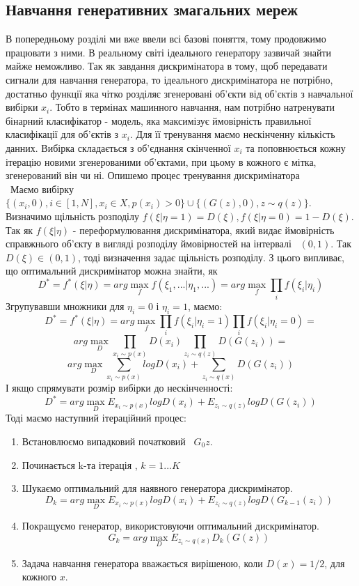 \documentclass{article}
\begin{document}
  \subsection{Навчання генеративних змагальних мереж}
  \null\quad В попередньому розділі ми вже ввели всі базові поняття, тому продовжимо працювати з ними. В реальному світі ідеального генератору зазвичай знайти майже неможливо. Так як завдання дискримінатора в тому, щоб передавати сигнали для навчання генератора, то ідеального дискримінатора не потрібно, достатньо функції яка чітко розділяє згенеровані об'єкти від об'єктів з навчальної вибірки ${x_i}$. Тобто в термінах машинного навчання, нам потрібно натренувати бінарний класифікатор - модель, яка максимізує ймовірність правильної класифікації для об'єктів з ${x_i}$. Для її тренування маємо нескінченну кількість данних. Вибірка складається з об'єднання скінченної ${x_i}$ та поповнюється кожну ітерацію новими згенерованими об'єктами, при цьому в кожного є мітка, згенерований він чи ні. Опишемо процес тренування дискримінатора \\
  \null\quad  Маємо вибірку $\{(x_i, 0), i \in [1, N], x_i \in X, p(x_i) > 0\} \cup \{(G(z), 0), z \sim q(z)\}$. Визначимо щільність розподілу $f(\xi | \eta = 1) = D(\xi), f(\xi | \eta = 0) = 1 - D(\xi)$. Так як $f(\xi | \eta)$ - переформулювання дискримінатора, який видає ймовірність справжнього об'єкту в вигляді розподілу ймовірностей на інтервалі  $(0, 1)$. Так $D(\xi) \in (0, 1)$, тоді визначення задає щільність розподілу. З цього випливає, що оптимальний дискримінатор можна знайти, як
  $$D^* = f^*(\xi | \eta) = arg \max_{f}f(\xi_1, ... | \eta_1, ...) = arg \max_{f} \prod_{i} f(\xi_i | \eta_i)$$
  Згрупувавши множники для $\eta_i = 0$ і $\eta_i = 1$, маємо:
  $$D^* = f^*(\xi | \eta) = arg \max_{f} \prod_{i} f(\xi_i | \eta_i = 1) \prod_{i} f(\xi_i | \eta_i = 0) = $$
  $$ arg \max_D \prod_{x_i \sim p(x)} D(x_i) \prod_{z_i \sim q(z)} D(G(z_i)) = $$
  $$arg\max_D \sum_{x_i \sim p(x)} log D(x_i) + \sum_{z_i \sim q(x)} D(G(z_i))$$
  І якщо спрямувати розмір вибірки до нескінченності:
  $$D^* = arg \max_D E_{x_i \sim p(x)} log D(x_i) + E_{z_i \sim q(z)} log D(G(z_i))$$
   Тоді маємо наступний ітераційний процес:
   \begin{enumerate}
   	\item Встановлюємо випадковий початковий  $G_0{z}$.
   	\item Починається k-та ітерація , $k = 1...K$
    \item Шукаємо оптимальний для наявного генератора дискримінатор.
    $$D_k = arg \max_D E_{x_i \sim p(x)} log D(x_i) + E_{z_i \sim q(z)} log D(G_{k-1}(z_i))$$
    \item Покращуємо генератор, використовуючи оптимальний дискримінатор.
    $$ G_k = arg \max_D E_{z_i \sim q(x)} D_k(G(z)) $$
    \item  Задача навчання генератора вважається вирішеною, коли $D(x) = 1/2$, для кожного $x$. 
   \end{enumerate}
\end{document}
